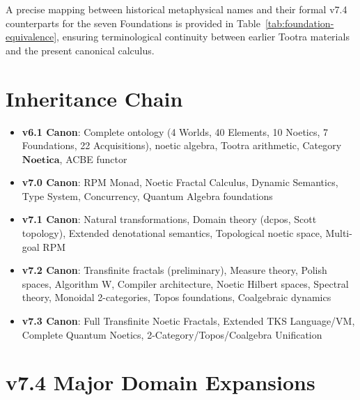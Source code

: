\documentclass[11pt,twoside,openright]{book}
\theoremstyle{definition}
\theoremstyle{plain}
\theoremstyle{remark}
\newcommand{\Noetica}{\mathbf{Noetica}}
\begin{document}
\medskip
\noindent A precise mapping between historical metaphysical names and their formal v7.4 counterparts for the seven Foundations is provided in Table~\ref{tab:foundation-equivalence}, ensuring terminological continuity between earlier Tootra materials and the present canonical calculus.

\section*{Inheritance Chain}

\begin{itemize}
  \item \textbf{v6.1 Canon}: Complete ontology (4 Worlds, 40 Elements, 10 Noetics, 7 Foundations, 22 Acquisitions), noetic algebra, Tootra arithmetic, Category $\Noetica$, ACBE functor
  \item \textbf{v7.0 Canon}: RPM Monad, Noetic Fractal Calculus, Dynamic Semantics, Type System, Concurrency, Quantum Algebra foundations
  \item \textbf{v7.1 Canon}: Natural transformations, Domain theory (dcpos, Scott topology), Extended denotational semantics, Topological noetic space, Multi-goal RPM
  \item \textbf{v7.2 Canon}: Transfinite fractals (preliminary), Measure theory, Polish spaces, Algorithm W, Compiler architecture, Noetic Hilbert spaces, Spectral theory, Monoidal 2-categories, Topos foundations, Coalgebraic dynamics
  \item \textbf{v7.3 Canon}: Full Transfinite Noetic Fractals, Extended TKS Language/VM, Complete Quantum Noetics, 2-Category/Topos/Coalgebra Unification
\end{itemize}

\section*{v7.4 Major Domain Expansions}
\end{document}
